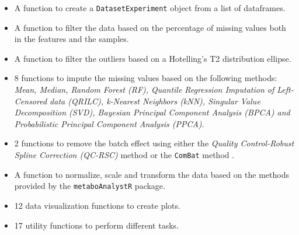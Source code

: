 \documentclass[ENG, BIB]{TFUOC}%
\begin{document}
\begin{itemize}
    \item A function to create a \texttt{DatasetExperiment} object from a list of dataframes.
    \item A function to filter the data based on the percentage of missing values both in the features and the samples.
    \item A function to filter the outliers based on a Hotelling's T2 distribution ellipse.
    \item 8 functions to impute the missing values based on the following methods: \textit{Mean, Median, Random Forest (RF), Quantile Regression Imputation of Left-Censored data (QRILC), k-Nearest Neighbors (kNN), Singular Value Decomposition (SVD), Bayesian Principal Component Analysis (BPCA) and Probabilistic Principal Component Analysis (PPCA)}.
    \item 2 functions to remove the batch effect using either the \textit{Quality Control-Robust Spline Correction (QC-RSC)} method or the \texttt{ComBat} method \cite{kirwan_characterising_2013,johnsonAdjustingBatchEffects2007}.
    \item A function to normalize, scale and transform the data based on the methods provided by the \texttt{metaboAnalystR} package.
    \item 12 data visualization functions to create plots.
    \item 17 utility functions to perform different tasks.
\end{itemize}
\end{document}
